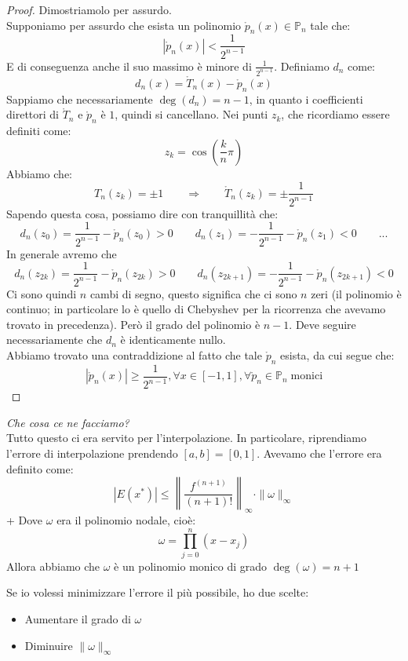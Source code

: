\documentclass[11pt,a4paper,twoside]{article}
\theoremstyle{definition}
\begin{document}
\begin{proof}
	Dimostriamolo per assurdo.\\
	Supponiamo per assurdo che esista un polinomio $\mathring p_n(x) \in \mathbb P_n$ tale che:
	\[ |\mathring p_n(x)|< \frac 1{2^{n-1}} \]
	E di conseguenza anche il suo massimo è minore di $\frac 1{2^{n-1}}$. Definiamo $d_n$ come:
	\[ d_n(x) = \mathring T_n(x) - \mathring p_n(x) \]
	Sappiamo che necessariamente $\deg(d_n) = n-1$, in quanto i coefficienti direttori di $\mathring T_n$ e $\mathring p_n$ è $1$, quindi si cancellano.
	Nei punti $z_k$, che ricordiamo essere definiti come:
	\[ z_k = \cos \left( \frac kn \pi \right) \]
	Abbiamo che:
	\[ T_n(z_k) = \pm 1\qquad \Rightarrow \qquad \mathring T_n(z_k) = \pm \frac 1{2^{n-1}} \]
	Sapendo questa cosa, possiamo dire con tranquillità che:
	\[ d_n(z_0) = \frac 1{2^{n-1}} - \mathring p_n(z_0) > 0\qquad d_n(z_1) = -\frac 1{2^{n-1}} - \mathring p_n(z_1)<0\qquad ...\]
	In generale avremo che
	\[ d_n(z_{2k}) = \frac 1{2^{n-1}} - \mathring p_n(z_{2k}) > 0\qquad d_n(z_{2k+1}) = -\frac 1{2^{n-1}} - \mathring p_n(z_{2k+1})<0\]
	Ci sono quindi $n$ cambi di segno, questo significa che ci sono $n$ zeri (il polinomio è continuo; in particolare lo è quello di Chebyshev per la ricorrenza che avevamo trovato in precedenza). Però il grado del polinomio è $n-1$. Deve seguire necessariamente che $d_n$ è identicamente nullo.\\
	Abbiamo trovato una contraddizione al fatto che tale $\mathring p_n$ esista, da cui segue che:
	\[ |\mathring p_n(x)|\geq \frac 1{2^{n-1}}, \forall x \in [-1,1], \forall \mathring p_n \in \mathbb P_n \; \text{monici} \]
\end{proof}

\textit{Che cosa ce ne facciamo?}\\
Tutto questo ci era servito per l'interpolazione. In particolare, riprendiamo l'errore di interpolazione prendendo $[a,b] = [0,1]$. Avevamo che l'errore era definito come:
\[ |E(x^*)| \leq \left\| \frac{f^{(n+1)}}{(n+1)!} \right\|_\infty \cdot \|\omega\|_\infty \]+
Dove $\omega$ era il polinomio nodale, cioè:
\[\omega = \prod_{j = 0}^n (x-x_j)\]
Allora abbiamo che $\omega$ è un polinomio monico di grado $\deg(\omega)=n+1$

Se io volessi minimizzare l'errore il più possibile, ho due scelte:
\begin{itemize}
	\item Aumentare il grado di $\omega$
	\item Diminuire $\|\omega\|_\infty$
\end{itemize}
\end{document}

